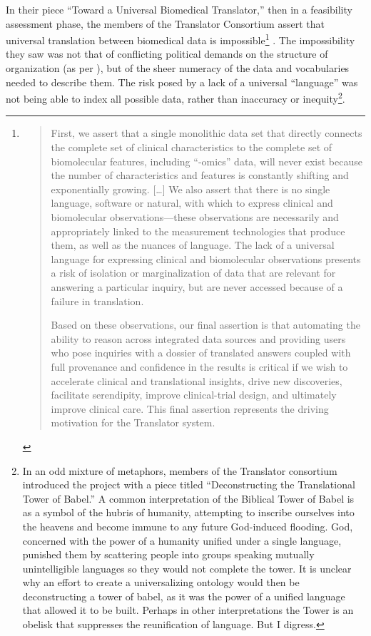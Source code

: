 In their piece ``Toward a Universal Biomedical Translator,'' then in a
feasibility assessment phase, the members of the Translator Consortium
assert that universal translation between biomedical data is
impossible\footnote{\begin{quote}
  First, we assert that a single monolithic data set that directly
  connects the complete set of clinical characteristics to the complete
  set of biomolecular features, including ``-omics'' data, will never
  exist because the number of characteristics and features is constantly
  shifting and exponentially growing. {[}\ldots{]} We also assert that
  there is no single language, software or natural, with which to
  express clinical and biomolecular observations---these observations
  are necessarily and appropriately linked to the measurement
  technologies that produce them, as well as the nuances of language.
  The lack of a universal language for expressing clinical and
  biomolecular observations presents a risk of isolation or
  marginalization of data that are relevant for answering a particular
  inquiry, but are never accessed because of a failure in translation.

  Based on these observations, our final assertion is that automating
  the ability to reason across integrated data sources and providing
  users who pose inquiries with a dossier of translated answers coupled
  with full provenance and confidence in the results is critical if we
  wish to accelerate clinical and translational insights, drive new
  discoveries, facilitate serendipity, improve clinical-trial design,
  and ultimately improve clinical care. This final assertion represents
  the driving motivation for the Translator system. \cite{consortiumUniversalBiomedicalData2019} 
  \end{quote}}\cite{consortiumUniversalBiomedicalData2019} . The
impossibility they saw was not that of conflicting political demands on
the structure of organization (as per \cite{bowkerSortingThingsOut1999} ), but of the sheer numeracy of the data
and vocabularies needed to describe them. The risk posed by a lack of a
universal ``language'' was not being able to index all possible data,
rather than inaccuracy or inequity\footnote{In an odd mixture of
  metaphors, members of the Translator consortium introduced the project
  with a piece titled ``Deconstructing the Translational Tower of
  Babel.'' \cite{austinDeconstructingTranslationalTower2019}  A
  common interpretation of the Biblical Tower of Babel is as a symbol of
  the hubris of humanity, attempting to inscribe ourselves into the
  heavens and become immune to any future God-induced flooding. God,
  concerned with the power of a humanity unified under a single
  language, punished them by scattering people into groups speaking
  mutually unintelligible languages so they would not complete the
  tower. It is unclear why an effort to create a universalizing ontology
  would then be deconstructing a tower of babel, as it was the power of
  a unified language that allowed it to be built. Perhaps in other
  interpretations the Tower is an obelisk that suppresses the
  reunification of language. But I digress.}.

